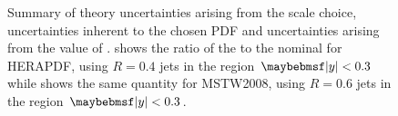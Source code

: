 \begin{figure}[htpb]
  \quad
  \caption{Summary of theory uncertainties arising from the scale choice, uncertainties inherent to the chosen PDF and uncertainties arising from the value of \alphaS. \protect{} shows the ratio of the \xs to the nominal \xs for HERAPDF, using \akt $R=0.4$ jets in the region $\absRap < 0.3$ while \protect{} shows the same quantity for MSTW2008, using \akt $R=0.6$ jets in the region $\absRap < 0.3$.}
  \label{fig:forward-inclusive:theory_uncertainties}
\end{figure}

